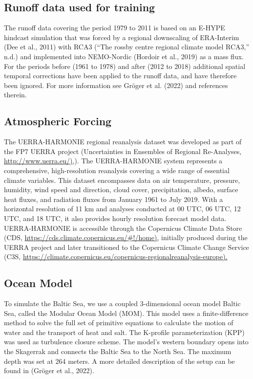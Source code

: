 \documentclass[
]{agujournal2019}
\begin{document}
\subsection{Runoff data used for
training}\label{runoff-data-used-for-training}

The runoff data covering the period 1979 to 2011 is based on an E-HYPE
hindcast simulation that was forced by a regional downscaling of
ERA-Interim (Dee et al., 2011) with RCA3 ({``The rossby centre regional
climate model RCA3,''} n.d.) and implemented into NEMO-Nordic (Hordoir
et al., 2019) as a mass flux. For the periods before (1961 to 1978) and
after (2012 to 2018) additional spatial temporal corrections have been
applied to the runoff data, and have therefore been ignored. For more
information see Gröger et al. (2022) and references therein.

\subsection{Atmospheric Forcing}\label{atmospheric-forcing}

The UERRA-HARMONIE regional reanalysis dataset was developed as part of
the FP7 UERRA project (Uncertainties in Ensembles of Regional
Re-Analyses, \href{http://www.uerra.eu/}{http://www.uerra.eu/)},). The
UERRA-HARMONIE system represents a comprehensive, high-resolution
reanalysis covering a wide range of essential climate variables. This
dataset encompasses data on air temperature, pressure, humidity, wind
speed and direction, cloud cover, precipitation, albedo, surface heat
fluxes, and radiation fluxes from January 1961 to July 2019. With a
horizontal resolution of 11 km and analyses conducted at 00 UTC, 06 UTC,
12 UTC, and 18 UTC, it also provides hourly resolution forecast model
data. UERRA-HARMONIE is accessible through the Copernicus Climate Data
Store (CDS, \url{https://cds.climate.copernicus.eu/\#!/home),} initially
produced during the UERRA project and later transitioned to the
Copernicus Climate Change Service (C3S,
\url{https://climate.copernicus.eu/copernicus-regionalreanalysis-europe).}

\subsection{Ocean Model}\label{ocean-model}

To simulate the Baltic Sea, we use a coupled 3-dimensional ocean model
Baltic Sea, called the Modular Ocean Model (MOM). This model uses a
finite-difference method to solve the full set of primitive equations to
calculate the motion of water and the transport of heat and salt. The
K-profile parameterization (KPP) was used as turbulence closure scheme.
The model's western boundary opens into the Skagerrak and connects the
Baltic Sea to the North Sea. The maximum depth was set at 264 meters. A
more detailed description of the setup can be found in (Gröger et al.,
2022).
\end{document}
